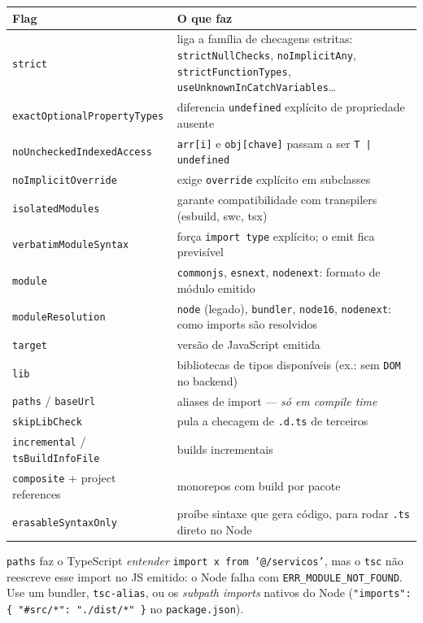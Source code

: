 \documentclass[12pt,a4paper,oneside]{book}
\newcommand{\code}[1]{\texttt{#1}}
\begin{document}
{\small
\begin{tabularx}{\textwidth}{@{}lX@{}}
\toprule
\textbf{Flag} & \textbf{O que faz} \\
\midrule
\code{strict} & liga a família de checagens estritas: \code{strictNullChecks}, \code{noImplicitAny}, \code{strictFunctionTypes}, \code{useUnknownInCatchVariables}\ldots \\
\code{exactOptionalPropertyTypes} & diferencia \code{undefined} explícito de propriedade ausente \\
\code{noUncheckedIndexedAccess} & \code{arr[i]} e \code{obj[chave]} passam a ser \code{T | undefined} \\
\code{noImplicitOverride} & exige \code{override} explícito em subclasses \\
\code{isolatedModules} & garante compatibilidade com transpilers (esbuild, swc, tsx) \\
\code{verbatimModuleSyntax} & força \code{import type} explícito; o emit fica previsível \\
\code{module} & \code{commonjs}, \code{esnext}, \code{nodenext}: formato de módulo emitido \\
\code{moduleResolution} & \code{node} (legado), \code{bundler}, \code{node16}, \code{nodenext}: como imports são resolvidos \\
\code{target} & versão de JavaScript emitida \\
\code{lib} & bibliotecas de tipos disponíveis (ex.: sem \code{DOM} no backend) \\
\code{paths} / \code{baseUrl} & aliases de import --- \emph{só em compile time} \\
\code{skipLibCheck} & pula a checagem de \code{.d.ts} de terceiros \\
\code{incremental} / \code{tsBuildInfoFile} & builds incrementais \\
\code{composite} + project references & monorepos com build por pacote \\
\code{erasableSyntaxOnly} & proíbe sintaxe que gera código, para rodar \code{.ts} direto no Node \\
\bottomrule
\end{tabularx}
}

\begin{cuidado}
\code{paths} faz o TypeScript \emph{entender} \code{import x from '@/servicos'}, mas o \code{tsc} não reescreve esse import no JS emitido: o Node falha com \code{ERR\_MODULE\_NOT\_FOUND}. Use um bundler, \code{tsc-alias}, ou os \emph{subpath imports} nativos do Node (\code{"imports": \{ "\#src/*": "./dist/*" \}} no \code{package.json}).
\end{cuidado}
\end{document}
